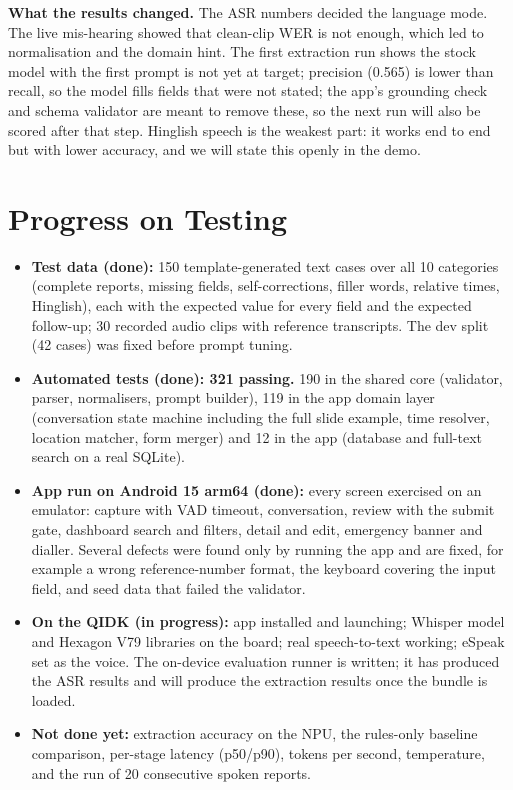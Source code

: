 \documentclass[9pt,a4paper]{extarticle}
\begin{document}
\textbf{What the results changed.} The ASR numbers decided the language mode. The live mis-hearing showed that clean-clip WER is not enough, which led to normalisation and the domain hint. The first extraction run shows the stock model with the first prompt is not yet at target; precision (0.565) is lower than recall, so the model fills fields that were not stated; the app's grounding check and schema validator are meant to remove these, so the next run will also be scored after that step. Hinglish speech is the weakest part: it works end to end but with lower accuracy, and we will state this openly in the demo.

\section{Progress on Testing}
\begin{itemize}
\item \textbf{Test data (done):} 150 template-generated text cases over all 10 categories (complete reports, missing fields, self-corrections, filler words, relative times, Hinglish), each with the expected value for every field and the expected follow-up; 30 recorded audio clips with reference transcripts. The dev split (42 cases) was fixed before prompt tuning.
\item \textbf{Automated tests (done): 321 passing.} 190 in the shared core (validator, parser, normalisers, prompt builder), 119 in the app domain layer (conversation state machine including the full slide example, time resolver, location matcher, form merger) and 12 in the app (database and full-text search on a real SQLite).
\item \textbf{App run on Android 15 arm64 (done):} every screen exercised on an emulator: capture with VAD timeout, conversation, review with the submit gate, dashboard search and filters, detail and edit, emergency banner and dialler. Several defects were found only by running the app and are fixed, for example a wrong reference-number format, the keyboard covering the input field, and seed data that failed the validator.
\item \textbf{On the QIDK (in progress):} app installed and launching; Whisper model and Hexagon V79 libraries on the board; real speech-to-text working; eSpeak set as the voice. The on-device evaluation runner is written; it has produced the ASR results and will produce the extraction results once the bundle is loaded.
\item \textbf{Not done yet:} extraction accuracy on the NPU, the rules-only baseline comparison, per-stage latency (p50/p90), tokens per second, temperature, and the run of 20 consecutive spoken reports.
\end{itemize}
\end{document}
